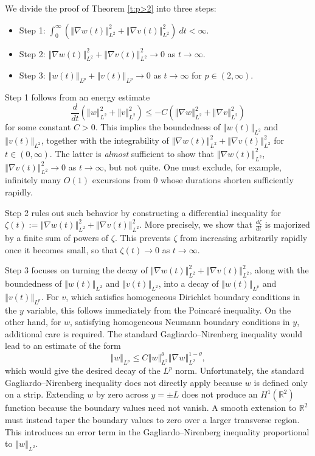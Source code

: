 \documentclass[final,11pt]{article}
\renewcommand{\leq}{\leqslant}
\theoremstyle{definition} %
\newcommand{\lv}{\left\Vert}
\newcommand{\rv}{\right\Vert}
\theoremstyle{plain}
\theoremstyle{definition} %
\theoremstyle{remark}
\begin{document}
We divide the proof of Theorem \ref{t:p>2} into three steps:
\begin{itemize}
    \item[$\bullet$] Step 1: $\displaystyle \int_0^\infty ( \lv \nabla w(t) \rv_{L^2}^2 + \lv \nabla v(t) \rv_{L^2}^2 )~dt<\infty$. 
    \item[$\bullet$] Step 2: $  \lv \nabla w(t) \rv_{L^2}^2 + \lv \nabla v(t) \rv_{L^2}^2 \to 0$ as $t\to \infty.$
    \item[$\bullet$] Step 3: $\lv w(t)\rv_{L^p} + \lv v(t)\rv_{L^p} \to 0$ as $t \to \infty$ for $p\in(2,\infty)$.
\end{itemize}

Step 1 follows from an energy estimate 
\[
\frac{d}{d t}(\lv w \rv_{L^2}^2 + \lv v\rv_{L^2}^2) \leq -C (\lv \nabla w \rv_{L^2}^2 + \lv \nabla v \rv_{L^2}^2)
\]
for some constant $C>0$. This implies the boundedness of $\lv w(t) \rv_{L^2}$ and $\lv v(t) \rv_{L^2}$, together with the integrability of $\lv \nabla w(t) \rv_{L^2}^2 + \lv \nabla v(t) \rv_{L^2}^2 $ for $t\in(0,\infty)$. The latter is \emph{almost} sufficient to show that $\lv \nabla w(t) \rv_{L^2}^2$, $\lv \nabla v(t) \rv_{L^2}^2 \to 0$ as $t\to\infty$, but not quite. One must exclude, for example, infinitely many $O(1)$ excursions from $0$ whose durations shorten sufficiently rapidly. 

Step 2 rules out such behavior by constructing a differential inequality for $\zeta(t):=\lv \nabla w(t) \rv_{L^2}^2 + \lv \nabla v(t) \rv_{L^2}^2 $. More precisely, we show that $\frac{d\zeta}{dt}$ is majorized by a finite sum of powers of $\zeta$. This prevents $\zeta$ from increasing arbitrarily rapidly once it becomes small, so that $\zeta(t) \to 0$  as $t\to \infty$. 

Step 3 focuses on turning the decay of $\lv \nabla w(t) \rv_{L^2}^2 + \lv \nabla v(t) \rv_{L^2}^2 $, along with the boundedness of $\lv w(t) \rv_{L^2}$ and $\lv v(t) \rv_{L^2}$, into a decay of $\lv w(t) \rv_{L^p}$ and $\lv v(t) \rv_{L^p}$. 
For $v$, which satisfies homogeneous Dirichlet boundary conditions in the $y$ variable, this follows immediately from the Poincar{\'e} inequality. On the other hand, for $w$, satisfying homogeneous Neumann boundary conditions in $y$, additional care is required. The standard Gagliardo--Nirenberg inequality would lead to an estimate of the form 
\[
\lv w \rv_{L^p} \leq C\lv w \rv_{L^2}^\theta \lv \nabla w \rv_{L^2}^{1-\theta},
\]
which would give the desired decay of the $L^p$ norm. Unfortunately, the standard Gagliardo--Nirenberg inequality does not directly apply because $w$ is defined only on a strip.  
Extending $w$ by zero across $y=\pm L$ does not produce an $H^1(\mathbb{R}^2)$ function because the boundary values need not vanish. A smooth extension to $\mathbb{R}^2$ must instead taper the boundary values to zero over a larger transverse region. This introduces an error term in the Gagliardo--Nirenberg inequality proportional to $\lv w \rv_{L^2}$. 
\end{document}
